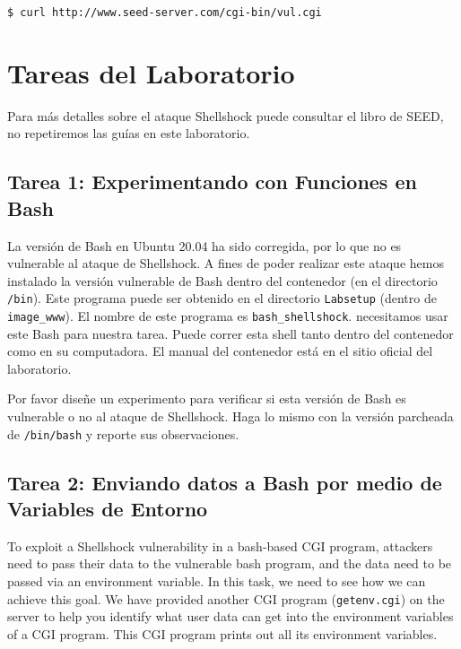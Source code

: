 \begin{lstlisting}
$ curl http://www.seed-server.com/cgi-bin/vul.cgi
\end{lstlisting}


\section{Tareas del Laboratorio}

Para más detalles sobre el ataque Shellshock puede consultar el libro de SEED, no repetiremos las guías en este laboratorio.

\subsection{Tarea 1: Experimentando con Funciones en Bash}

La versión de Bash en Ubuntu 20.04 ha sido corregida, por lo que no es vulnerable al ataque de Shellshock. A fines de poder realizar este ataque hemos instalado la versión vulnerable de Bash dentro del contenedor (en el directorio  \texttt{/bin}). 
Este programa puede ser obtenido en el directorio \texttt{Labsetup} (dentro de \texttt{image\_www}). 
El nombre de este programa es \texttt{bash\_shellshock}. necesitamos usar este Bash para nuestra tarea. Puede correr esta shell tanto dentro del contenedor como en su computadora.
El manual del contenedor está en el sitio oficial del laboratorio.

Por favor diseñe un experimento para verificar si esta versión de Bash es vulnerable o no al ataque de Shellshock. Haga lo mismo con la versión parcheada de \texttt{/bin/bash} y reporte sus observaciones.


\subsection{Tarea 2: Enviando datos a Bash por medio de Variables de Entorno}


To exploit a Shellshock vulnerability in a bash-based CGI program, attackers need to 
pass their data to the vulnerable bash program, and the data need to be
passed via an environment variable. In this task, we need to see how we can
achieve this goal. We have provided another CGI program (\texttt{getenv.cgi}) on the 
server to help you identify what user data can get into the environment
variables of a CGI program. This CGI program prints out all
its environment variables. 


